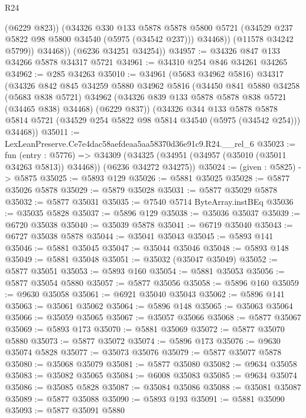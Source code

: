\begin{lexlean}{R24}
\begin{coremodule}
                (@6229 @823))
              (@34326
                @330
                @133
                @5878
                @5878
                @5800
                @5721
                (@34529 @237 @5822 @98 @5800 @34540 (@5975 (@34542 @237)))
                @34468))
            (@11578 @34242 @5799))
          @34468))
      (@6236 @34251 @34254))
@34957 := @34326 @847 @133 @34266 @5878 @34317 @5721
@34961 := @34310 @254 @846 @34261 @34265
@34962 := @285 @34263
@35010 := @34961
    (@5683 @34962 @5816)
    @34317
    (@34326
      @842
      @845
      @34259
      @5880
      @34962
      @5816
      (@34450
        @841
        @5880
        @34258
        (@5683 @838 @5721)
        @34962
        (@34326 @839 @133 @5878 @5878 @838 @5721 (@34465 @838) @34468)
        (@6229 @837))
      (@34326
        @344
        @133
        @5878
        @5878
        @5814
        @5721
        (@34529 @254 @5822 @98 @5814 @34540 (@5975 (@34542 @254)))
        @34468))
@35011 := LexLeanPreserve.Ce7e4dac58aefdeaa5aa58370d36e91c9.R24.__rel_6
@35023 := fun (entry : @5776) =>
  @34309 (@34325 (@34951 (@34957 (@35010 (@35011 @34263 @5813)) @34468)) (@6236 @34272 @34275))
@35024 := (given : @5825) -> @5875
@35025 := @5893 @129
@35026 := @5881 @35025
@35028 := @5877 @35026 @5878
@35029 := @5879 @35028
@35031 := @5877 @35029 @5878
@35032 := @5877 @35031
@35035 := @7540 @5714 ByteArray.instBEq
@35036 := @35035 @5828
@35037 := @5896 @129
@35038 := @35036 @35037
@35039 := @6720 @35038
@35040 := @35039 @5878
@35041 := @6719 @35040
@35043 := @6727 @35038 @5878
@35044 := @35041 @35043
@35045 := @5893 @141
@35046 := @5881 @35045
@35047 := @35044 @35046
@35048 := @5893 @148
@35049 := @5881 @35048
@35051 := @35032 (@35047 @35049)
@35052 := @5877 @35051
@35053 := @5893 @160
@35054 := @5881 @35053
@35056 := @5877 @35054 @5880
@35057 := @5877 @35056
@35058 := @5896 @160
@35059 := @9630 @35058
@35061 := @6921 @35040 @35043
@35062 := @5896 @141
@35063 := @35061 @35062
@35064 := @5896 @148
@35065 := @35063 @35064
@35066 := @35059 @35065
@35067 := @35057 @35066
@35068 := @5877 @35067
@35069 := @5893 @173
@35070 := @5881 @35069
@35072 := @5877 @35070 @5880
@35073 := @5877 @35072
@35074 := @5896 @173
@35076 := @9630 @35074 @5828
@35077 := @35073 @35076
@35079 := @5877 @35077 @5878
@35080 := @35068 @35079
@35081 := @5877 @35080
@35082 := @9634 @35058
@35083 := @35082 @35065
@35084 := @6008 @35083
@35085 := @9634 @35074
@35086 := @35085 @5828
@35087 := @35084 @35086
@35088 := @35081 @35087
@35089 := @5877 @35088
@35090 := @5893 @193
@35091 := @5881 @35090
@35093 := @5877 @35091 @5880

\end{coremodule}
\end{lexlean}
